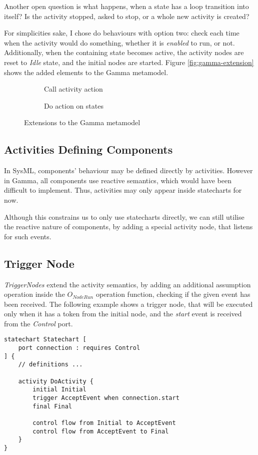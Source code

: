 Another open question is what happens, when a state has a loop transition into itself? Is the activity stopped, asked to stop, or a whole new activity is created?

For simplicities sake, I chose do behaviours with option two: check each time when the activity would do something, whether it is \emph{enabled} to run, or not. Additionally, when the containing state becomes active, the activity nodes are reset to \emph{Idle} state, and the initial nodes are started. Figure \autoref{fig:gamma-extension} shows the added elements to the Gamma metamodel.


\begin{figure}[!ht]
	\begin{subfigure}{.66\textwidth}
		\centering
		
		\caption{Call activity action}
	\end{subfigure}%
	\begin{subfigure}{.33\textwidth}
		\centering
		
		\caption{Do action on states}
	\end{subfigure}
	\caption{Extensions to the Gamma metamodel}
	\label{fig:gamma-extension}
\end{figure}

\subsection{Activities Defining Components}

In SysML, components' behaviour may be defined directly by activities. However in Gamma, all components use reactive semantics, which would have been difficult to implement. Thus, activities may only appear inside statecharts for now.

Although this constrains us to only use statecharts directly, we can still utilise the reactive nature of components, by adding a special activity node, that listens for such events.

\subsection{Trigger Node}

\emph{TriggerNodes} extend the activity semantics, by adding an additional assumption operation inside the \(	O_\mathit{NodeRun}\) operation function, checking if the given event has been received. The following example shows a trigger node, that will be executed only when it has a token from the initial node, and the \emph{start} event is received from the \emph{Control} port.
\vspace{6mm}
\begin{lstlisting}[language=statechart]
statechart Statechart [
	port connection : requires Control
] {
	// definitions ...
	
	activity DoActivity {
		initial Initial
		trigger AcceptEvent when connection.start
		final Final
		
		control flow from Initial to AcceptEvent
		control flow from AcceptEvent to Final
	}
}
\end{lstlisting}

